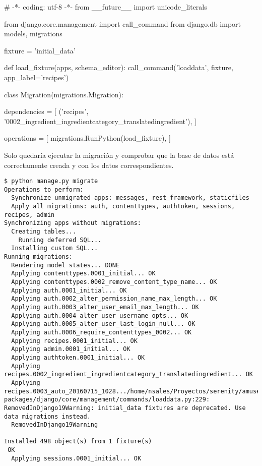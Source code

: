     
\begin{pythoncode}
# -*- coding: utf-8 -*-
from __future__ import unicode_literals

from django.core.management import call_command
from django.db import models, migrations

fixture = 'initial_data'

def load_fixture(apps, schema_editor):
    call_command('loaddata', fixture, app_label='recipes')
        
class Migration(migrations.Migration):
    
    dependencies = [
        ('recipes', '0002_ingredient_ingredientcategory_translatedingredient'),
    ]

    operations = [
        migrations.RunPython(load_fixture),
    ]
\end{pythoncode}

Solo quedaría ejecutar la migración y comprobar que la base de datos está
correctamente creada y con los datos correspondientes.


\begin{verbatim}
$ python manage.py migrate                            
Operations to perform:
  Synchronize unmigrated apps: messages, rest_framework, staticfiles
  Apply all migrations: auth, contenttypes, authtoken, sessions, recipes, admin
Synchronizing apps without migrations:
  Creating tables...
    Running deferred SQL...
  Installing custom SQL...
Running migrations:
  Rendering model states... DONE
  Applying contenttypes.0001_initial... OK
  Applying contenttypes.0002_remove_content_type_name... OK
  Applying auth.0001_initial... OK
  Applying auth.0002_alter_permission_name_max_length... OK
  Applying auth.0003_alter_user_email_max_length... OK
  Applying auth.0004_alter_user_username_opts... OK
  Applying auth.0005_alter_user_last_login_null... OK
  Applying auth.0006_require_contenttypes_0002... OK
  Applying recipes.0001_initial... OK
  Applying admin.0001_initial... OK
  Applying authtoken.0001_initial... OK
  Applying recipes.0002_ingredient_ingredientcategory_translatedingredient... OK
  Applying recipes.0003_auto_20160715_1028.../home/nsales/Proyectos/serenity/amuseapi/env/lib/python3.4/site-packages/django/core/management/commands/loaddata.py:229: RemovedInDjango19Warning: initial_data fixtures are deprecated. Use data migrations instead.
  RemovedInDjango19Warning

Installed 498 object(s) from 1 fixture(s)
 OK
  Applying sessions.0001_initial... OK
\end{verbatim}

